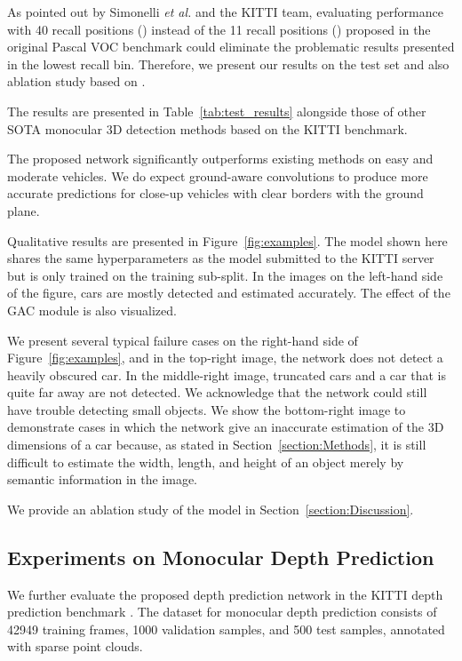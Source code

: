 \documentclass[letterpaper, 10 pt, journal, twoside]{IEEEtran}
\begin{document}
As pointed out by  Simonelli \textit{et al.} \cite{Simonelli2019MonoDIS} and the KITTI team, evaluating performance with 40 recall positions () instead of the 11 recall positions () proposed in the original Pascal VOC benchmark\cite{Everingham10pascal} could eliminate the problematic results presented in the lowest recall bin.
Therefore, we present our results on the test set and also ablation study based on .


The results are presented in Table~\ref{tab:test_results} alongside those of other SOTA monocular 3D detection methods based on the KITTI benchmark.

The proposed network significantly outperforms existing methods on easy and moderate vehicles. 
We do expect ground-aware convolutions to produce more accurate predictions for close-up vehicles with clear borders with the ground plane.

Qualitative results are presented in Figure~\ref{fig:examples}. The model shown here shares the same hyperparameters as the model submitted to the KITTI server but is only trained on the training sub-split. In the images on the left-hand side of the figure, cars are mostly detected and estimated accurately. The effect of the GAC module is also visualized.

We present several typical failure cases on the right-hand side of Figure~\ref{fig:examples}, and in the top-right image, the network does not detect a heavily obscured car.
In the middle-right image, truncated cars and a car that is quite far away are not detected.
We acknowledge that the network could still have trouble detecting small objects.
We show the bottom-right image to demonstrate cases in which the network give an inaccurate estimation of the 3D dimensions of a car because, as stated in Section~\ref{section:Methods}, it is still difficult to estimate the width, length, and height of an object merely by semantic information in the image. 

We provide an ablation study of the model in Section~\ref{section:Discussion}.

\subsection{Experiments on Monocular Depth Prediction}

We further evaluate the proposed depth prediction network in the KITTI depth prediction benchmark \cite{Geiger2012KITTI}.  The dataset for monocular depth prediction consists of 42949 training frames, 1000 validation samples, and 500 test samples, annotated with sparse point clouds.
\end{document}

